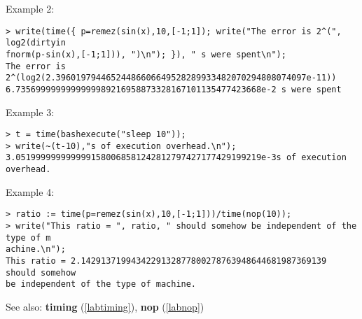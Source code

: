 \noindent Example 2: 
\begin{center}\begin{minipage}{15cm}\begin{Verbatim}[frame=single]
> write(time({ p=remez(sin(x),10,[-1;1]); write("The error is 2^(", log2(dirtyin
fnorm(p-sin(x),[-1;1])), ")\n"); }), " s were spent\n");
The error is 2^(log2(2.39601979446524486606649528289933482070294808074097e-11))
6.7356999999999999989216958873328167101135477423668e-2 s were spent
\end{Verbatim}
\end{minipage}\end{center}
\noindent Example 3: 
\begin{center}\begin{minipage}{15cm}\begin{Verbatim}[frame=single]
> t = time(bashexecute("sleep 10"));
> write(~(t-10),"s of execution overhead.\n");
3.0519999999999991580068581242812797427177429199219e-3s of execution overhead.
\end{Verbatim}
\end{minipage}\end{center}
\noindent Example 4: 
\begin{center}\begin{minipage}{15cm}\begin{Verbatim}[frame=single]
> ratio := time(p=remez(sin(x),10,[-1;1]))/time(nop(10));
> write("This ratio = ", ratio, " should somehow be independent of the type of m
achine.\n");
This ratio = 2.1429137199434229132877800278763948644681987369139 should somehow 
be independent of the type of machine.
\end{Verbatim}
\end{minipage}\end{center}
See also: \textbf{timing} (\ref{labtiming}), \textbf{nop} (\ref{labnop})

